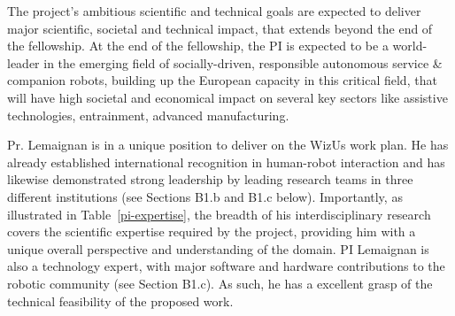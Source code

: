 \documentclass[11pt,a4paper]{report}
\newcommand{\project}{WizUs\xspace}
\begin{document}
The project's ambitious scientific and technical goals are expected to deliver
major scientific, societal and technical impact, that extends beyond the end of
the fellowship. At the end of the fellowship, the PI is expected to be a
world-leader in the emerging field of socially-driven, responsible autonomous
service \& companion robots, building up the European capacity in this critical
field, that will have high societal and economical impact on several key sectors
like assistive technologies, entrainment, advanced manufacturing.

Pr. Lemaignan is in a unique position to deliver on the \project work plan.  He
has already established international recognition in human-robot interaction and
has likewise demonstrated strong leadership by leading research teams in three
different institutions (see Sections B1.b and B1.c below). Importantly, as
illustrated in Table~\ref{pi-expertise}, the breadth of
his interdisciplinary research covers the scientific expertise required by the
project, providing him with a unique overall perspective and understanding of
the domain. PI Lemaignan is also a technology expert, with major software and
hardware contributions to the robotic community (see Section B1.c). As such, he
has a excellent grasp of the technical feasibility of the proposed work.
\end{document}
